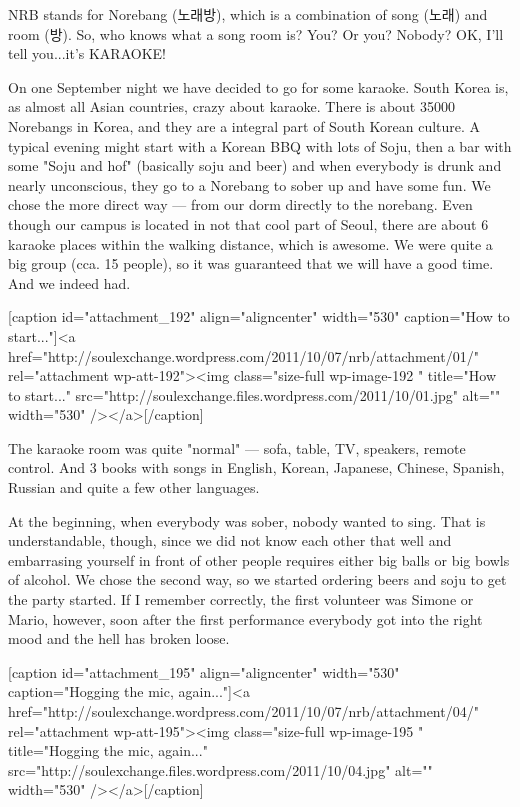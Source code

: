 \begin{post}
	\begin{content}
NRB stands for Norebang (노래방), which is a combination of song (노래) and room (방). So, who knows what a song room is? You? Or you? Nobody? OK, I'll tell you...it's KARAOKE!



On one September night we have decided to go for some karaoke. South Korea is, as almost all Asian countries, crazy about karaoke. There is about 35000 Norebangs in Korea, and they are a integral part of South Korean culture. A typical evening might start with a Korean BBQ with lots of Soju, then a bar with some "Soju and hof" (basically soju and beer) and when everybody is drunk and nearly unconscious, they go to a Norebang to sober up and have some fun. We chose the more direct way — from our dorm directly to the norebang. Even though our campus is located in not that cool part of Seoul, there are about 6 karaoke places within the walking distance, which is awesome. We were quite a big group (cca. 15 people), so it was guaranteed that we will have a good time. And we indeed had.



[caption id="attachment_192" align="aligncenter" width="530" caption="How to start..."]<a href="http://soulexchange.wordpress.com/2011/10/07/nrb/attachment/01/" rel="attachment wp-att-192"><img class="size-full wp-image-192 " title="How to start..." src="http://soulexchange.files.wordpress.com/2011/10/01.jpg" alt="" width="530" /></a>[/caption]



The karaoke room was quite "normal" — sofa, table, TV, speakers, remote control. And 3 books with songs in English, Korean, Japanese, Chinese, Spanish, Russian and quite a few other languages.



At the beginning, when everybody was sober, nobody wanted to sing. That is understandable, though, since we did not know each other that well and embarrasing yourself in front of other people requires either big balls or big bowls of alcohol. We chose the second way, so we started ordering beers and soju to get the party started. If I remember correctly, the first volunteer was Simone or Mario, however, soon after the first performance everybody got into the right mood and the hell has broken loose.



[caption id="attachment_195" align="aligncenter" width="530" caption="Hogging the mic, again..."]<a href="http://soulexchange.wordpress.com/2011/10/07/nrb/attachment/04/" rel="attachment wp-att-195"><img class="size-full wp-image-195 " title="Hogging the mic, again..." src="http://soulexchange.files.wordpress.com/2011/10/04.jpg" alt="" width="530" /></a>[/caption]




\end{content}
\end{post}
